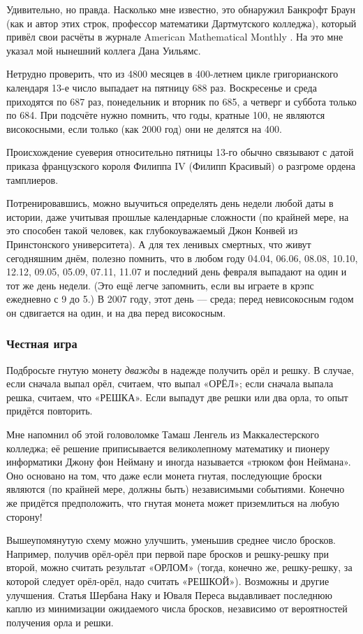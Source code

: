 Удивительно, но правда.
Насколько мне известно, это обнаружил Банкрофт Браун (как и автор этих строк, профессор математики Дартмутского колледжа), который привёл свои расчёты в журнале American Mathematical Monthly \cite{11}.
На это мне указал мой нынешний коллега Дана Уильямс.

Нетрудно проверить, что из 4800 месяцев в 400-летнем цикле григорианского календаря 13-е число выпадает на пятницу 688 раз.
Воскресенье и среда приходятся по 687 раз, понедельник и вторник по 685, а четверг и суббота только по 684.
При подсчёте нужно помнить, что годы, кратные 100, не являются високосными, если только (как 2000 год) они не делятся на 400.

Происхождение суеверия относительно пятницы 13-го обычно связывают с датой приказа французского короля Филиппа IV (Филипп Красивый) о разгроме ордена тамплиеров.

Потренировавшись, можно выучиться определять день недели любой даты в истории, даже учитывая прошлые календарные сложности
(по крайней мере, на это способен такой человек, как глубокоуважаемый Джон Конвей из Принстонского университета).
А для тех ленивых смертных, что живут сегодняшним днём, полезно помнить, что в любом году
04.04, 06.06, 08.08, 10.10, 12.12, 09.05, 05.09, 07.11, 11.07 и последний день февраля выпадают на один и тот же день недели.
(Это ещё легче запомнить, если вы играете в крэпс ежедневно с 9 до 5.)
В 2007 году, этот день --- среда;
перед невисокосным годом он сдвигается на один, и на два перед високосным.


\subsubsection*{Честная игра}

Подбросьте гнутую монету \emph{дважды} в надежде получить орёл и решку.
В случае, если сначала выпал орёл, считаем, что выпал «ОРЁЛ»;
если сначала выпала решка, считаем, что «РЕШКА».
Если выпадут две решки или два орла, то опыт придётся повторить.

Мне напомнил об этой головоломке Тамаш Ленгель из Маккалестерского колледжа;
её решение приписывается великолепному математику и пионеру информатики  Джону фон Нейману и иногда называется «трюком фон Неймана».
Оно основано на том, что даже если монета гнутая, последующие броски являются (по крайней мере, должны быть) независимыми событиями.
Конечно же придётся предположить, что гнутая монета может приземлиться на любую сторону!

Вышеупомянутую схему можно улучшить, уменьшив среднее число бросков.
Например, получив орёл-орёл при первой паре бросков и решку-решку при второй, можно считать результат «ОРЛОМ» (тогда, конечно же, решку-решку, за которой следует орёл-орёл, надо считать «РЕШКОЙ»).
Возможны и другие улучшения.
Статья Шербана Наку и Юваля Переса \cite{44} выдавливает последнюю каплю из минимизации ожидаемого числа бросков, независимо от вероятностей получения орла и решки.

